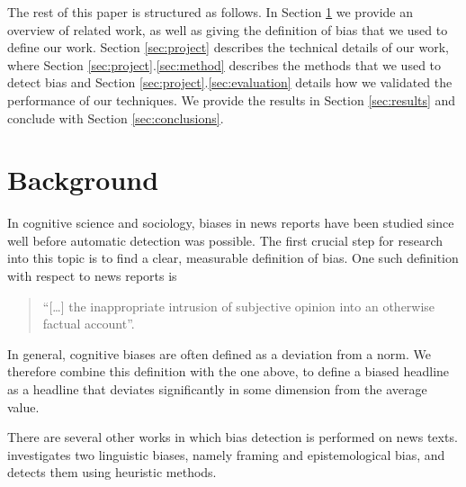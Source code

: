 \documentclass[final]{ieee}
\begin{document}
The rest of this paper is structured as follows. In Section \ref{sec:background} we provide an overview of related work, as well as giving the definition of bias that we used to define our work. Section \ref{sec:project} describes the technical details of our work, where Section \ref{sec:project}.\ref{sec:method} describes the methods that we used to detect bias and Section \ref{sec:project}.\ref{sec:evaluation} details how we validated the performance of our techniques. We provide the results in Section \ref{sec:results} and conclude with Section \ref{sec:conclusions}. 

     

            
            
\section{Background}\label{sec:background}

In cognitive science and sociology, biases in news reports have been studied since well before automatic detection was possible. The first crucial step for research into this topic is to find a clear, measurable definition of bias. One such definition with respect to news reports is \begin{quotation}
``[\dots] the inappropriate intrusion of subjective opinion into an otherwise factual account''.\cite{STOCKING89}
\end{quotation}
In general, cognitive biases are often defined as a deviation from a norm. We therefore combine this definition with the one above, to define a biased headline as a headline that deviates significantly in some dimension from the average value.
  
There are several other works in which bias detection is performed on news texts. \cite{RECASENS13} investigates two linguistic biases, namely framing and epistemological bias, and detects them using heuristic methods. 


%            
%
\end{document}
